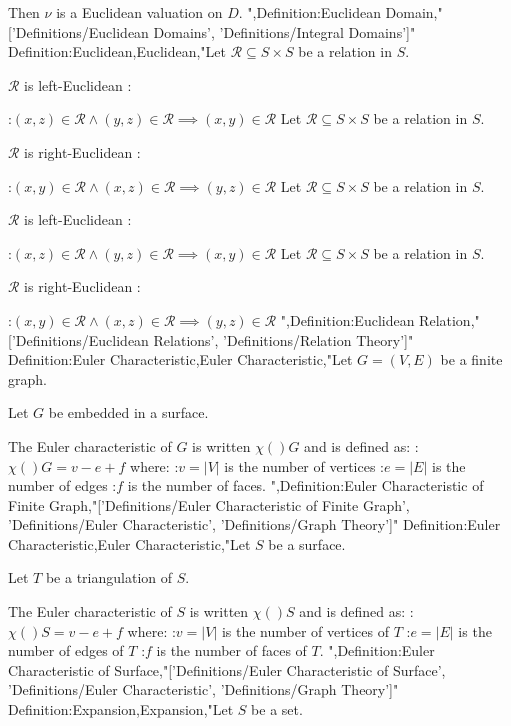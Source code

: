 Then $\nu$ is a Euclidean valuation on $D$.
",Definition:Euclidean Domain,"['Definitions/Euclidean Domains', 'Definitions/Integral Domains']"
Definition:Euclidean,Euclidean,"Let $\mathcal R \subseteq S \times S$ be a relation in $S$.


$\mathcal R$ is left-Euclidean :

:$\left( x, z \right) \in \mathcal R \land \left( y, z \right) \in \mathcal R \implies \left( x, y \right) \in \mathcal R$
Let $\mathcal R \subseteq S \times S$ be a relation in $S$.


$\mathcal R$ is right-Euclidean :

:$\left( x, y \right) \in \mathcal R \land \left( x, z \right) \in \mathcal R \implies \left( y, z \right) \in \mathcal R$
Let $\mathcal R \subseteq S \times S$ be a relation in $S$.


$\mathcal R$ is left-Euclidean :

:$\left( x, z \right) \in \mathcal R \land \left( y, z \right) \in \mathcal R \implies \left( x, y \right) \in \mathcal R$
Let $\mathcal R \subseteq S \times S$ be a relation in $S$.


$\mathcal R$ is right-Euclidean :

:$\left( x, y \right) \in \mathcal R \land \left( x, z \right) \in \mathcal R \implies \left( y, z \right) \in \mathcal R$
",Definition:Euclidean Relation,"['Definitions/Euclidean Relations', 'Definitions/Relation Theory']"
Definition:Euler Characteristic,Euler Characteristic,"Let $G = \left( V, E \right)$ be a finite graph.

Let $G$ be embedded in a surface.


The Euler characteristic of $G$ is written $\chi \left(   \right)G$ and is defined as:
:$\chi \left(   \right)G = v - e + f$
where:
:$v = \left\lvert V \right\rvert$ is the number of vertices
:$e = \left\lvert E \right\rvert$ is the number of edges
:$f$ is the number of faces.
",Definition:Euler Characteristic of Finite Graph,"['Definitions/Euler Characteristic of Finite Graph', 'Definitions/Euler Characteristic', 'Definitions/Graph Theory']"
Definition:Euler Characteristic,Euler Characteristic,"Let $S$ be a surface.

Let $T$ be a triangulation of $S$.

The Euler characteristic of $S$ is written $\chi \left(   \right)S$ and is defined as:
:$\chi \left(   \right)S = v - e + f$
where:
:$v = \left\lvert V \right\rvert$ is the number of vertices of $T$
:$e = \left\lvert E \right\rvert$ is the number of edges of $T$
:$f$ is the number of faces of $T$.
",Definition:Euler Characteristic of Surface,"['Definitions/Euler Characteristic of Surface', 'Definitions/Euler Characteristic', 'Definitions/Graph Theory']"
Definition:Expansion,Expansion,"Let $S$ be a set.

